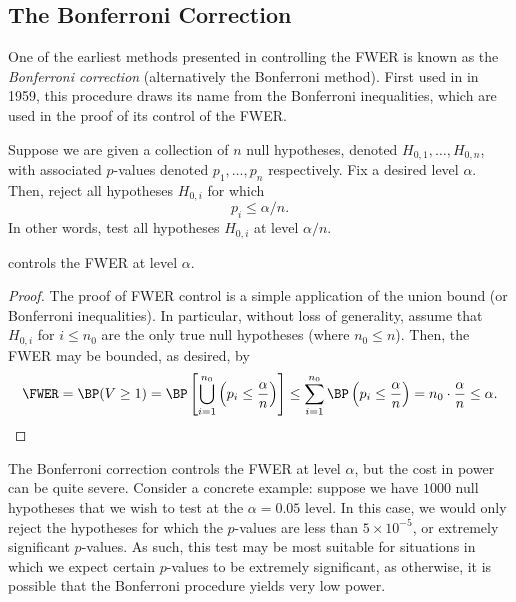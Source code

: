 \subsection{The Bonferroni Correction}
One of the earliest methods presented in controlling the FWER is known as the \emph{Bonferroni correction} (alternatively the Bonferroni method). First used in \cite{dunn} in 1959, this procedure draws its name from the Bonferroni inequalities, which are used in the proof of its control of the FWER.
\begin{proc}
\label{bonfcorr}
Suppose we are given a collection of $n$ null hypotheses, denoted $H_{0, 1}, \ldots, H_{0, n}$, with associated $p$-values denoted $p_1, \ldots, p_n$ respectively. Fix a desired level $\alpha$. Then, reject all hypotheses $H_{0, i}$ for which
\begin{equation}
p_i \leq \alpha / n.
\end{equation} In other words, test all hypotheses $H_{0, i}$ at level $\alpha / n$.
\end{proc}
\begin{prop}
 controls the FWER at level $\alpha$.
\end{prop}
\begin{proof}
The proof of FWER control is a simple application of the union bound (or Bonferroni inequalities). In particular, without loss of generality, assume that $H_{0,i}$ for $i \leq n_0$ are the only true null hypotheses (where $n_0 \leq n$). Then, the FWER may be bounded, as desired, by
\begin{equation}
\FWER = \BP(V \geq 1) = \BP \left[ \bigcup_{i=1}^{n_0} \left( p_i \leq \frac{\alpha}{n} \right) \right] \leq \sum_{i=1}^{n_0} \BP\left( p_i \leq \frac{\alpha}{n}  \right) = n_0 \cdot \frac{\alpha}{n} \leq \alpha.
\end{equation}
\end{proof}
The Bonferroni correction controls the FWER at level $\alpha$, but the cost in power can be quite severe. Consider a concrete example: suppose we have $1000$ null hypotheses that we wish to test at the $\alpha = 0.05$ level. In this case, we would only reject the hypotheses for which the $p$-values are less than $5 \times 10^{-5}$, or extremely significant $p$-values. As such, this test may be most suitable for situations in which we expect certain $p$-values to be extremely significant, as otherwise, it is possible that the Bonferroni procedure yields very low power.

